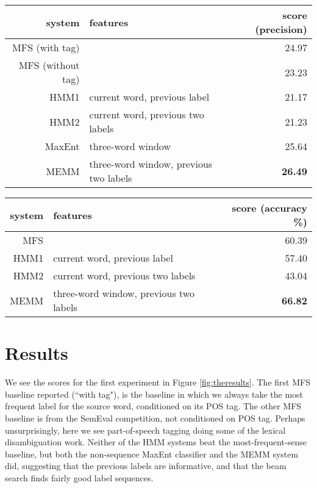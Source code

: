 \documentclass[11pt]{article}
\begin{document}
\begin{figure*}[t!]
  \begin{center}
  \begin{tabular}{|r|l|r|}
    \hline
    system & features & score (precision) \\
    \hline
     MFS (with tag) &                                 & 24.97 \\
     MFS (without tag) &                              & 23.23 \\
    \hline
     HMM1    & current word, previous label           & 21.17 \\
     HMM2    & current word, previous two labels      & 21.23 \\
     MaxEnt  & three-word window                      & 25.64 \\
     MEMM    & three-word window, previous two labels & \textbf{26.49} \\
    \hline
  \end{tabular}
  \end{center}
\caption{Results for the first experiment; SemEval 2013 CL-WSD task.}
\label{fig:theresults}
\end{figure*}

\begin{figure*}[t!]
  \begin{center}
  \begin{tabular}{|r|l|r|}
    \hline
    system & features & score (accuracy \%) \\
    \hline
    MFS      &                                        & 60.39  \\
    \hline
     HMM1    & current word, previous label           & 57.40  \\
     HMM2    & current word, previous two labels      & 43.04  \\
     MEMM    & three-word window, previous two labels & \textbf{66.82}  \\
    \hline
  \end{tabular}
  \end{center}
\caption{Results for the second experiment; all-words lexical selection on the
Guarani Bible}
\label{fig:theresults2}
\end{figure*}

\section{Results}
We see the scores for the first experiment in Figure \ref{fig:theresults}. The
first MFS baseline reported (``with tag"), is the baseline in which we always
take the most frequent label for the source word, conditioned on its POS tag.
The other MFS baseline is from the SemEval competition, not conditioned on POS
tag. Perhaps unsurprisingly, here we see part-of-speech tagging doing some of
the lexical disambiguation work. Neither of the HMM systems beat the
most-frequent-sense baseline, but both the non-sequence MaxEnt classifier and
the MEMM system did, suggesting that the previous labels are informative, and
that the beam search finds fairly good label sequences.
\end{document}
